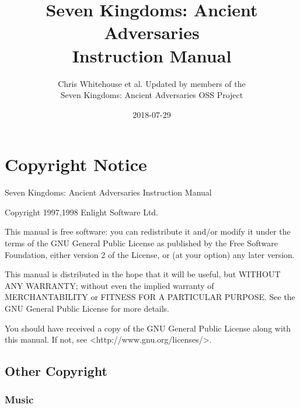\documentclass[openany]{book}
\begin{document}
\begin{titlepage}
	\title{Seven Kingdoms: Ancient Adversaries \\
		Instruction Manual}
	\author{Chris Whitehouse et al. Updated by members of the \\
		Seven Kingdoms: Ancient Adversaries OSS Project} %
	\date{2018-07-29} %
\end{titlepage}

\frontmatter
\maketitle

\section{Copyright Notice}

Seven Kingdoms: Ancient Adversaries Instruction Manual

Copyright 1997,1998 Enlight Software Ltd.

This manual is free software: you can redistribute it and/or modify it under the terms of the GNU General Public License as published by the Free Software Foundation, either version 2 of the License, or (at your option) any later version.

This manual is distributed in the hope that it will be useful, but WITHOUT ANY WARRANTY; without even the implied warranty of MERCHANTABILITY or FITNESS FOR A PARTICULAR PURPOSE.  See the GNU General Public License for more details.

You should have received a copy of the GNU General Public License along with this manual.  If not, see <http://www.gnu.org/licenses/>.

\subsection{Other Copyright}

\subsubsection{Music}
\end{document}
